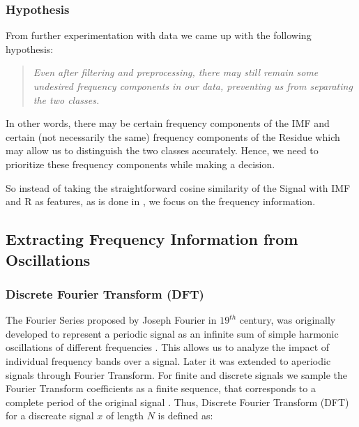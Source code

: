 \documentclass[12pt,a4paper]{article}
\begin{document}
\subsubsection{Hypothesis}

From further experimentation with data we came up with the following hypothesis:

\begin{quote}
\em Even after filtering and preprocessing, there may still remain some undesired frequency components in our data, preventing us from separating the two classes.\em
\end{quote}


In other words, there may be certain frequency components of the IMF and certain (not necessarily the same) frequency components of the Residue which may allow us to distinguish the two classes accurately. Hence, we need to prioritize these frequency components while making a decision. %

So instead of taking the straightforward cosine similarity of the Signal with IMF and R as features, as is done in \cite{anas2011exploiting}, we focus on the frequency information.%

\subsection{Extracting Frequency Information from Oscillations}
\label{dtft}



\subsubsection{Discrete Fourier Transform (DFT)}
The Fourier Series proposed by Joseph Fourier in $19^{th}$ century, was originally developed to represent a periodic signal as an infinite sum of simple harmonic oscillations of different frequencies \cite{oppenheim1999discrete}. This allows us to analyze the impact of individual frequency bands over a signal. Later it was extended to aperiodic signals through Fourier Transform. For finite and discrete signals we sample the Fourier Transform coefficients as a finite sequence, that corresponds to a complete period of the original signal \cite{oppenheim1999discrete}. Thus, Discrete Fourier Transform (DFT) for a discreate signal $x$ of length $N$ is defined as:
\end{document}

